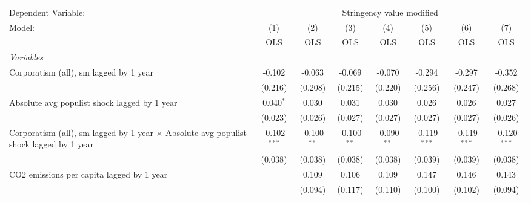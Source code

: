 
\begingroup
\centering
\begin{tabular}{lccccccc}
   \toprule
   Dependent Variable: & \multicolumn{7}{c}{Stringency value modified}\\
   Model:                                                                                        & (1)            & (2)           & (3)           & (4)           & (5)            & (6)            & (7)\\  
                                                                                                 &  OLS           & OLS           & OLS           & OLS           & OLS            & OLS            & OLS\\  
   \midrule
   \emph{Variables}\\
   Corporatism (all), sm lagged by 1 year                                                        & -0.102         & -0.063        & -0.069        & -0.070        & -0.294         & -0.297         & -0.352\\   
                                                                                                 & (0.216)        & (0.208)       & (0.215)       & (0.220)       & (0.256)        & (0.247)        & (0.268)\\   
   Absolute avg populist shock lagged by 1 year                                                  & 0.040$^{*}$    & 0.030         & 0.031         & 0.030         & 0.026          & 0.026          & 0.027\\   
                                                                                                 & (0.023)        & (0.026)       & (0.027)       & (0.027)       & (0.027)        & (0.027)        & (0.026)\\   
   Corporatism (all), sm lagged by 1 year $\times$ Absolute avg populist shock lagged by 1 year  & -0.102$^{***}$ & -0.100$^{**}$ & -0.100$^{**}$ & -0.090$^{**}$ & -0.119$^{***}$ & -0.119$^{***}$ & -0.120$^{***}$\\   
                                                                                                 & (0.038)        & (0.038)       & (0.038)       & (0.038)       & (0.039)        & (0.039)        & (0.038)\\   
   CO2 emissions per capita lagged by 1 year                                                     &                & 0.109         & 0.106         & 0.109         & 0.147          & 0.146          & 0.143\\   
                                                                                                 &                & (0.094)       & (0.117)       & (0.110)       & (0.100)        & (0.102)        & (0.094)\\   

\end{tabular}
